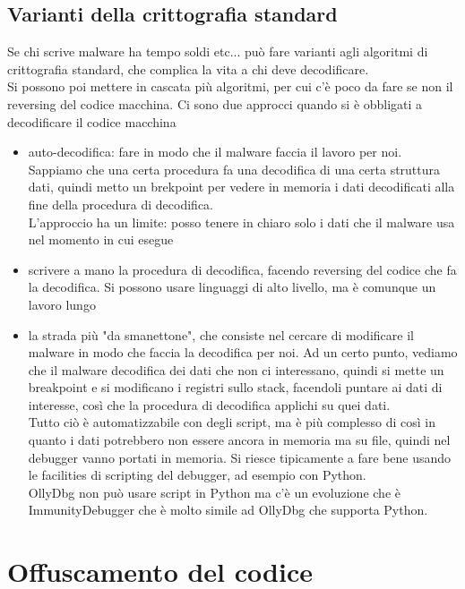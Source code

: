 \documentclass[12pt, oneside]{extbook}
\begin{document}
\subsection{Varianti della crittografia standard}
Se chi scrive malware ha tempo soldi etc... può fare varianti agli algoritmi di crittografia standard, che complica la vita a chi deve decodificare.\\Si possono poi mettere in cascata più algoritmi, per cui c'è poco da fare se non il reversing del codice macchina. Ci sono due approcci quando si è obbligati a decodificare il codice macchina
\begin{itemize}
	\item auto-decodifica: fare in modo che il malware faccia il lavoro per noi. Sappiamo che una certa procedura fa una decodifica di una certa struttura dati, quindi metto un brekpoint per vedere in memoria i dati decodificati alla fine della procedura di decodifica.\\L'approccio ha un limite: posso tenere in chiaro solo i dati che il malware usa nel momento in cui esegue
	\item scrivere a mano la procedura di decodifica, facendo reversing del codice che fa la decodifica. Si possono usare linguaggi di alto livello, ma è comunque un lavoro lungo
	\item la strada più "da smanettone", che consiste nel cercare di modificare il malware in modo che faccia la decodifica per noi. Ad un certo punto, vediamo che il malware decodifica dei dati che non ci interessano, quindi si mette un breakpoint e si modificano i registri sullo stack, facendoli puntare ai dati di interesse, così che la procedura di decodifica applichi su quei dati.\\Tutto ciò è automatizzabile con degli script, ma è più complesso di così in quanto i dati potrebbero non essere ancora in memoria ma su file, quindi nel debugger vanno portati in memoria. Si riesce tipicamente a fare bene usando le facilities di scripting del debugger, ad esempio con Python.\\OllyDbg non può usare script in Python ma c'è un evoluzione che è ImmunityDebugger che è molto simile ad OllyDbg che supporta Python.
\end{itemize}
\section{Offuscamento del codice}
\end{document}
